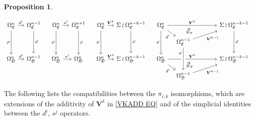 \documentclass[a4paper,10pt
,draft
]{article}%
\numberwithin{equation}{section}
\numberwithin{figure}{section}
\newtheorem{proposition}[equation]{Proposition}%
\theoremstyle{definition} %
\newcommand{\1}{\ensuremath{\mathbbm 1}}%
\begin{document}
\begin{proposition}
\begin{enumerate}[label = (\roman*)]
\[\begin{tikzcd}[column sep = 10pt, row sep = small]
	\Omega^n_{\mathfrak{C}} \ar{r}{d^i} \ar{dd}[swap]{\varphi} &
	\Omega^{n-1}_{\mathfrak{C}} \ar{dd}{\varphi}
&
	\Omega^n_{\mathfrak{C}} \ar{r}{s^j} \ar{dd}[swap]{\varphi} &
	\Omega^{n+1}_{\mathfrak{C}} \ar{dd}{\varphi}
&
	\Omega^n_{\mathfrak{C}} \ar{r}{\boldsymbol{V}^k} \ar{dd}[swap]{\varphi} &
	\Sigma \wr \Omega^{n-k-1}_{\mathfrak{C}} \ar{dd}{\varphi}
&
	\Omega^n_{\mathfrak{C}}
	\ar{rrrrr}[name=toE]{\boldsymbol{V}^k} \ar{rd}[swap]{d^i} \ar{dd}[swap]{\varphi}
	&&&
	&&
	\Sigma \wr \Omega^{n-k-1}_{\mathfrak{C}} \ar{dd}{\varphi}
\\
	&
&
	&
&
	&
&
	&
	|[alias=DBE]|
	\Omega^{n-1}_{\mathfrak{C}} \ar{rrrru}[swap]{\boldsymbol{V}^{k-1}}
\\
	\Omega^n_{\mathfrak{D}} \ar{r}{d^i} &
	\Omega^{n-1}_{\mathfrak{D}}
&
	\Omega^n_{\mathfrak{D}} \ar{r}{s^j} &
	\Omega^n_{\mathfrak{D}}
&
	\Omega^n_{\mathfrak{D}} \ar{r}{\boldsymbol{V}^k} &
	\Sigma \wr \Omega^{n-k-1}_{\mathfrak{D}}
&
	\Omega^n_{\mathfrak{D}} \ar{rrrrr}[name=toB]{\boldsymbol{V}^k} \ar{rd}[swap]{d^i}
	&&&
	&&
	\Sigma \wr \Omega^{n-k-1}_{\mathfrak{D}}
\\
	&
&
	&
&
	&
&
	&
	|[alias=D]| \Omega^{n-1}_{\mathfrak{D}} \ar{rrrru}[swap]{\boldsymbol{V}^{k-1}}
\arrow[Leftrightarrow, from=DBE, to=toE, shorten <=0.15cm,shorten >=0.15cm
,swap,"\pi"
]
	\arrow[Leftrightarrow, from=D, to=toB, shorten <=0.15cm,shorten >=0.15cm,swap,"\pi"]
	\arrow[from=DBE, to=D, crossing over, near start, swap, "\varphi"]
\end{tikzcd}
\]
\end{enumerate}
\end{proposition}


The following lists the compatibilities between the $\pi_{i,k}$ isomorphisms, 
which are extensions of the additivity of $\boldsymbol{V}^k$ in \eqref{VKADD EQ} and of the simplicial identities between the $d^i$, $s^j$ operators.
\end{document}
